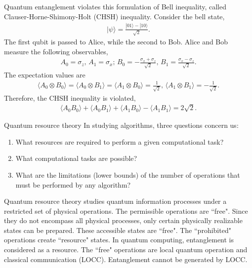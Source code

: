 \documentclass{beamer}
\begin{document}
\begin{frame}
\justify
Quantum entanglement violates this formulation of Bell inequality, called Clauser-Horne-Shimony-Holt (CHSH) inequality.
\vfill
Consider the bell state,
\begin{align}
|\psi\rangle = \frac{|01\rangle - |10\rangle}{\sqrt{2}}.
\end{align}
\vfill
The first qubit is passed to Alice, while the second to Bob. Alice and Bob measure the following observables,
\begin{align*}
A_0 = \sigma_z,\, A_1 = \sigma_x;\, B_0 = -\frac{\sigma_x + \sigma_z}{\sqrt{2}},\, B_1 = \frac{\sigma_x - \sigma_z}{\sqrt{2}}.
\end{align*}
\vfill
The expectation values are
\begin{align*}
\langle A_0 \otimes B_0 \rangle = \langle A_0 \otimes B_1 \rangle = \langle A_1 \otimes B_0 \rangle = \frac{1}{\sqrt{2}},\, \langle A_1 \otimes B_1 \rangle = - \frac{1}{\sqrt{2}}.
\end{align*}
\vfill
Therefore, the CHSH inequality is violated,
\begin{align}
\langle A_0 B_0 \rangle + \langle A_0 B_1 \rangle + \langle A_1 B_0 \rangle - \langle A_1 B_1 \rangle = 2\sqrt{2}.
\end{align}
\end{frame}

\begin{frame}{Quantum resource theory}
\justify
In studying algorithms, three questions concern us:
\begin{enumerate}
\item What resources are required to perform a given computational task?
\item What computational tasks are possible?
\item What are the limitations (lower bounds) of the number of operations that must be performed by any algorithm?
\end{enumerate}
\vfill
Quantum resource theory studies quantum information processes under a restricted set of physical operations.
\vfill
The permissible operations are ``free". Since they do not encompass all physical processes, only certain physically realizable states can be prepared. These accessible states are ``free".
\vfill
The ``prohibited" operations create ``resource" states.
\vfill
In quantum computing, entanglement is considered as a resource. The ``free" operations are local quantum operation and classical communication (LOCC). Entanglement cannot be generated by LOCC.
\end{frame}
\end{document}
